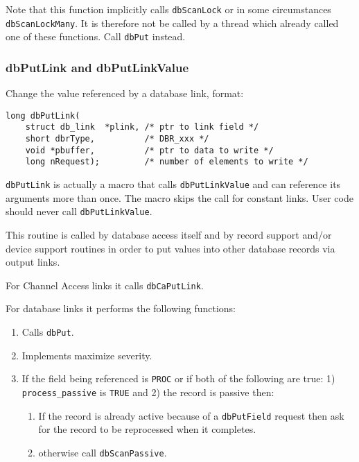 Note that this function implicitly calls \verb|dbScanLock| or in some circumstances \verb|dbScanLockMany|.
It is therefore not be called by a thread which already called one of these functions.
Call \verb|dbPut| instead.

\subsubsection{dbPutLink and dbPutLinkValue}

Change the value referenced by a database link, format:

\begin{verbatim}
long dbPutLink(
    struct db_link  *plink, /* ptr to link field */
    short dbrType,          /* DBR_xxx */
    void *pbuffer,          /* ptr to data to write */
    long nRequest);         /* number of elements to write */
\end{verbatim}

\verb|dbPutLink| is actually a macro that calls \verb|dbPutLinkValue| and can reference its arguments more than once.
The macro skips the call for constant links.
User code should never call \verb|dbPutLinkValue|.

This routine is called by database access itself and by record support and/or device support routines in order to put values into other database records via output links.

For Channel Access links it calls \verb|dbCaPutLink|.

For database links it performs the following functions:

\begin{enumerate}

\item Calls \verb|dbPut|.

\item Implements maximize severity.

\item If the field being referenced is \verb|PROC| or if both of the following are true: 1) \verb|process_passive| is \verb|TRUE| and 2) the record is passive then:

\begin{enumerate}

\item If the record is already active because of a \verb|dbPutField| request then ask for the record to be reprocessed when it completes.

\item otherwise call \verb|dbScanPassive|.

\end{enumerate}
\end{enumerate}

